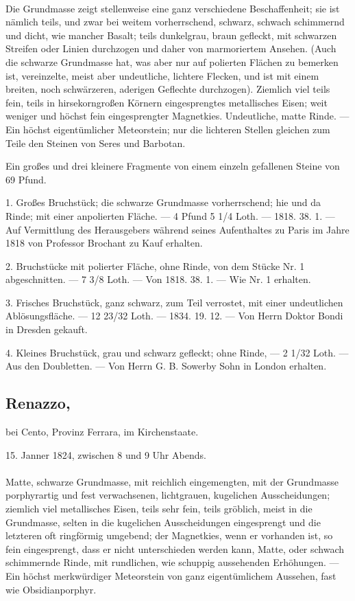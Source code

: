 \documentclass[a4paper, 11pt, oneside, polutonikogreek, german]{article}
\begin{document}
\paragraph{}
Die Grundmasse zeigt stellenweise eine ganz verschiedene Beschaffenheit; sie ist nämlich teils, und zwar bei weitem vorherrschend, schwarz, schwach schimmernd und dicht, wie mancher Basalt; teils dunkelgrau, braun gefleckt, mit schwarzen Streifen oder Linien durchzogen und daher von marmoriertem Ansehen. (Auch die schwarze Grundmasse hat, was aber nur auf polierten Flächen zu bemerken ist, vereinzelte, meist aber undeutliche, lichtere Flecken, und ist mit einem breiten, noch schwärzeren, aderigen Geflechte durchzogen). Ziemlich viel teils fein, teils in hirsekorngroßen Körnern eingesprengtes metallisches Eisen; weit weniger und höchst fein eingesprengter Magnetkies. Undeutliche, matte Rinde. — Ein höchst eigentümlicher Meteorstein; nur die lichteren Stellen gleichen zum Teile den Steinen von Seres und Barbotan.

Ein großes und drei kleinere Fragmente von einem einzeln gefallenen Steine von 69 Pfund.

1. Großes Bruchstück; die schwarze Grundmasse vorherrschend; hie und da Rinde; mit einer anpolierten Fläche. — 4 Pfund 5 1/4 Loth. — 1818. 38. 1. — Auf Vermittlung des Herausgebers während seines Aufenthaltes zu Paris im Jahre 1818 von Professor Brochant zu Kauf erhalten.

2. Bruchstücke mit polierter Fläche, ohne Rinde, von dem Stücke Nr. 1 abgeschnitten. — 7 3/8 Loth. — Von 1818. 38. 1. — Wie Nr. 1 erhalten.

3. Frisches Bruchstück, ganz schwarz, zum Teil verrostet, mit einer undeutlichen Ablösungsfläche. — 12 23/32 Loth. — 1834. 19. 12. — Von Herrn Doktor Bondi in Dresden gekauft.

4. Kleines Bruchstück, grau und schwarz gefleckt; ohne Rinde, — 2 1/32 Loth. — Aus den Doubletten. — Von Herrn G. B. Sowerby Sohn in London erhalten.
\subsection{Renazzo,}
\begin{center}
\small
bei Cento, Provinz Ferrara, im Kirchenstaate.

15. Janner 1824, zwischen 8 und 9 Uhr Abends.
\end{center}
\paragraph{}
Matte, schwarze Grundmasse, mit reichlich eingemengten, mit der Grundmasse porphyrartig und fest verwachsenen, lichtgrauen, kugelichen Ausscheidungen; ziemlich viel metallisches Eisen, teils sehr fein, teils gröblich, meist in die Grundmasse, selten in die kugelichen Ausscheidungen eingesprengt und die letzteren oft ringförmig umgebend; der Magnetkies, wenn er vorhanden ist, so fein eingesprengt, dass er nicht unterschieden werden kann, Matte, oder schwach schimmernde Rinde, mit rundlichen, wie schuppig aussehenden Erhöhungen. — Ein höchst merkwürdiger Meteorstein von ganz eigentümlichem Aussehen, fast wie Obsidianporphyr.
\end{document}
